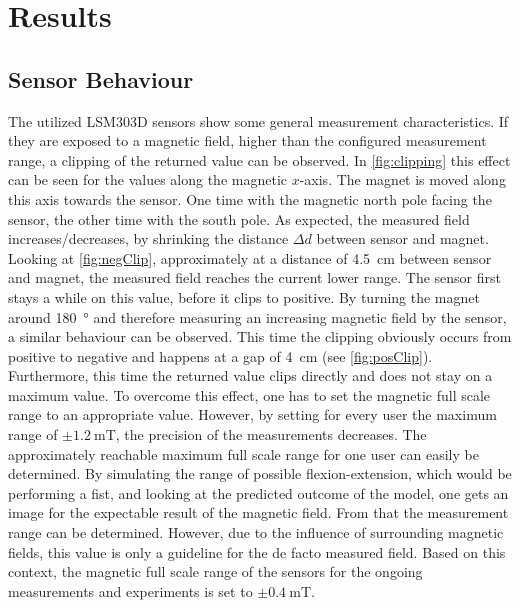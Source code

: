 \lhead[\chaptername~\thechapter]{\rightmark}

\rhead[\leftmark]{}

\lfoot[\thepage]{}

\cfoot{}

\rfoot[]{\thepage}

\chapter{Results} \label{cha:results}

\section{Sensor Behaviour} \label{sec:dataRes}

The utilized LSM303D sensors show some general measurement characteristics. If they are exposed to a magnetic field, higher than the configured measurement range, a clipping of the returned value can be observed. In \ref{fig:clipping} this effect can be seen for the values along the magnetic $ x $-axis. The magnet is moved along this axis towards the sensor. One time with the magnetic north pole facing the sensor, the other time with the south pole. As expected, the measured field increases/decreases, by shrinking the distance $ \Delta d $ between sensor and magnet. Looking at \ref{fig:negClip}, approximately at a distance of \SI{4.5}{\cm} between sensor and magnet, the measured field reaches the current lower range. The sensor first stays a while on this value, before it clips to positive. By turning the magnet around \SI{180}{\degree} and therefore measuring an increasing magnetic field by the sensor, a similar behaviour can be observed. This time the clipping obviously occurs from positive to negative and happens at a gap of \SI{4}{\cm} (see \ref{fig:posClip}). Furthermore, this time the returned value clips directly and does not stay on a maximum value. To overcome this effect, one has to set the magnetic full scale range to an appropriate value. However, by setting for every user the maximum range of $ \pm \SI{1.2}{\milli \tesla} $, the precision of the measurements decreases. The approximately reachable maximum full scale range for one user can easily be determined. By simulating the range of possible flexion-extension, which would be performing a fist, and looking at the predicted outcome of the  model, one gets an image for the expectable result of the magnetic field. From that the measurement range can be determined. However, due to the influence of surrounding magnetic fields, this value is only a guideline for the de facto measured field. Based on this context, the magnetic full scale range of the sensors for the ongoing measurements and experiments is set to $ \pm \SI{0.4}{\milli \tesla} $.

